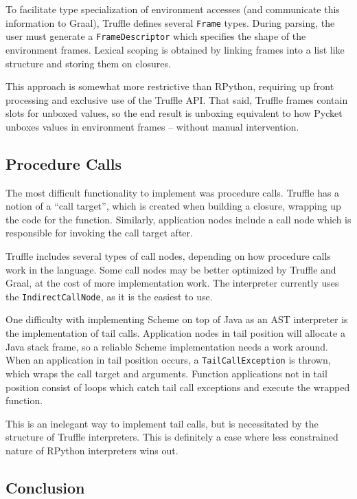 \documentclass[8pt]{article}
\begin{document}
To facilitate type specialization of environment accesses (and communicate this
information to Graal), Truffle defines several \texttt{Frame} types.
During parsing, the user must generate a \texttt{FrameDescriptor} which
specifies the shape of the environment frames.
Lexical scoping is obtained by linking frames into a list like structure and
storing them on closures.

This approach is somewhat more restrictive than RPython, requiring up front
processing and exclusive use of the Truffle API.
That said, Truffle frames contain slots for unboxed values, so the end result is
unboxing equivalent to how Pycket unboxes values in environment frames -- without
manual intervention.

\subsection{Procedure Calls}

The most difficult functionality to implement was procedure calls.
Truffle has a notion of a ``call target'', which is created when building
a closure, wrapping up the code for the function.
Similarly, application nodes include a call node which is responsible for invoking
the call target after.

Truffle includes several types of call nodes, depending on how procedure calls work
in the language.
Some call nodes may be better optimized by Truffle and Graal, at the cost of
more implementation work.
The interpreter currently uses the \texttt{IndirectCallNode}, as it is the easiest
to use.

One difficulty with implementing Scheme on top of Java as an AST interpreter is
the implementation of tail calls.
Application nodes in tail position will allocate a Java stack frame, so a reliable
Scheme implementation needs a work around.
When an application in tail position occurs, a \texttt{TailCallException} is
thrown, which wraps the call target and arguments.
Function applications not in tail position consist of loops which catch tail call
exceptions and execute the wrapped function.

This is an inelegant way to implement tail calls, but is necessitated by the
structure of Truffle interpreters.
This is definitely a case where less constrained nature of RPython interpreters
wins out.

\subsection{Conclusion}
\end{document}

